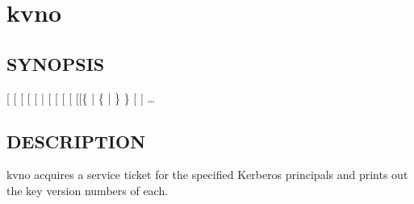 \documentclass[letterpaper,10pt,english]{sphinxmanual}
\begin{document}
\sphinxstepscope


\section{kvno}
\label{\detokenize{user/user_commands/kvno:kvno}}\label{\detokenize{user/user_commands/kvno:kvno-1}}\label{\detokenize{user/user_commands/kvno::doc}}

\subsection{SYNOPSIS}
\label{\detokenize{user/user_commands/kvno:synopsis}}
\sphinxAtStartPar
{}
{[} \sphinxstyleemphasis{ccache}{]}
{[} \sphinxstyleemphasis{etype}{]}
{[} \sphinxstyleemphasis{keytab}{]}
{[}\sphinxstylestrong{\sphinxhyphen{}q}{]}
{[} |  \sphinxstyleemphasis{sname}{]}
{[}\sphinxstylestrong{\sphinxhyphen{}P}{]}
{[}\sphinxstylestrong{\textendash{}cached\sphinxhyphen{}only}{]}
{[}\sphinxstylestrong{\textendash{}no\sphinxhyphen{}store}{]}
{[} \sphinxstyleemphasis{cache}{]}
{[}{[}\{  | \{ | \} \} {[}\sphinxstylestrong{\sphinxhyphen{}P}{]}{]} |  \sphinxstyleemphasis{ccache}{]}
 …


\subsection{DESCRIPTION}
\label{\detokenize{user/user_commands/kvno:description}}
\sphinxAtStartPar
kvno acquires a service ticket for the specified Kerberos principals
and prints out the key version numbers of each.
\end{document}
